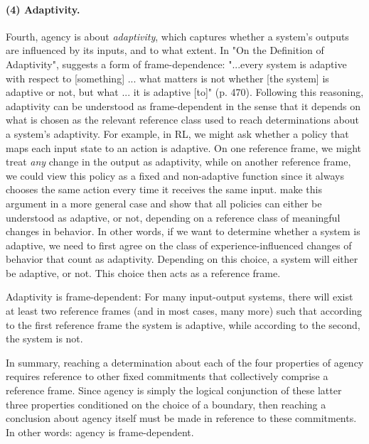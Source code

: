 \documentclass[11pt]{article} %
\begin{document}
%
\paragraph{(4) Adaptivity.} Fourth, agency is about \textit{adaptivity}, which captures whether a system's outputs are influenced by its inputs, and to what extent. 
%
%
In "On the Definition of Adaptivity", \cite{zadeh1963definition} suggests a form of frame-dependence: "...every system is adaptive with respect to [something] ... what matters is not whether [the system] is adaptive or not, but what ... it is adaptive [to]" (p. 470). Following this reasoning, adaptivity can be understood as frame-dependent in the sense that it depends on what is chosen as the relevant reference class used to reach determinations about a system's adaptivity. 
%
For example, in RL, we might ask whether a policy that maps each input state to an action is adaptive. On one reference frame, we might treat \textit{any} change in the output as adaptivity, while on another reference frame, we could view this policy as a fixed and non-adaptive function since it always chooses the same action every time it receives the same input.  \cite{abel2023crl} make this argument in a more general case and show that all policies can either be understood as adaptive, or not, depending on a reference class of meaningful changes in behavior. 
%
In other words, if we want to determine whether a system is adaptive, we need to first agree on the class of experience-influenced changes of behavior that count as adaptivity. Depending on this choice, a system will either be adaptive, or not. This choice then acts as a reference frame. 
%


%
\begin{claim}
%
Adaptivity is frame-dependent: For many input-output systems, there will exist at least two reference frames (and in most cases, many more) such that according to the first reference frame the system is adaptive, while according to the second, the system is not.
\end{claim}


%
In summary, reaching a determination about each of the four properties of agency requires reference to other fixed commitments that collectively comprise a reference frame. Since agency is simply the logical conjunction of these latter three properties conditioned on the choice of a boundary, then reaching a conclusion about agency itself must be made in reference to these commitments. In other words: agency is frame-dependent.
\end{document}
